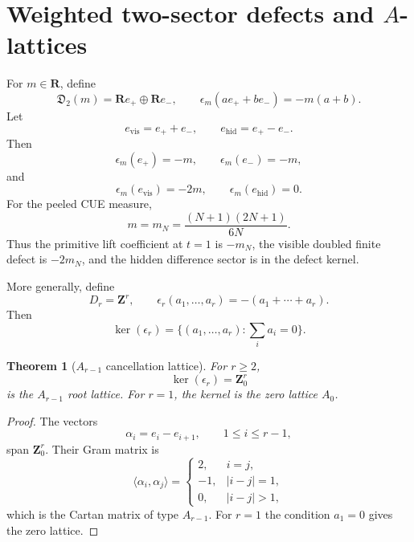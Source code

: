 \documentclass[11pt]{article}
\newcommand{\R}{\mathbf R}
\newcommand{\Z}{\mathbf Z}
\newcommand{\1}{\mathbf 1}
\newcommand{\vis}{\mathrm{vis}}
\newcommand{\hid}{\mathrm{hid}}
\newtheorem{theorem}{Theorem}[section]
\numberwithin{equation}{section}
\begin{document}
\section{Weighted two-sector defects and $A$-lattices}\label{sec:defect-module}

For $m\in\R$, define
\begin{equation}
  \mathfrak D_2(m)=\R e_+\oplus\R e_-,
  \qquad
  \epsilon_m(ae_++be_-)=-m(a+b).
\end{equation}
Let
\begin{equation}
  e_{\vis}=e_++e_-,
  \qquad
  e_{\hid}=e_+-e_-.
\end{equation}
Then
\begin{equation}
  \epsilon_m(e_+)=-m,
  \qquad
  \epsilon_m(e_-)=-m,
\end{equation}
and
\begin{equation}
  \epsilon_m(e_{\vis})=-2m,
  \qquad
  \epsilon_m(e_{\hid})=0.
\end{equation}
For the peeled CUE measure,
\begin{equation}
  m=m_N=\frac{(N+1)(2N+1)}{6N}.
\end{equation}
Thus the primitive lift coefficient at $t=1$ is $-m_N$, the visible doubled finite defect is $-2m_N$, and the hidden difference sector is in the defect kernel.

More generally, define
\begin{equation}
  D_r=\Z^r,
  \qquad
  \epsilon_r(a_1,\dots,a_r)=-(a_1+\cdots+a_r).
\end{equation}
Then
\begin{equation}
  \ker(\epsilon_r)=\{(a_1,\dots,a_r):\sum_i a_i=0\}.
\end{equation}

\begin{theorem}[$A_{r-1}$ cancellation lattice]\label{thm:A-lattice}
For $r\ge2$,
\begin{equation}
  \ker(\epsilon_r)=\Z^r_0
\end{equation}
is the $A_{r-1}$ root lattice.  For $r=1$, the kernel is the zero lattice $A_0$.
\end{theorem}

\begin{proof}
The vectors
\begin{equation}
  \alpha_i=e_i-e_{i+1},\qquad 1\le i\le r-1,
\end{equation}
span $\Z^r_0$.  Their Gram matrix is
\begin{equation}
  \langle\alpha_i,\alpha_j\rangle=
  \begin{cases}
    2,&i=j,\\
    -1,&|i-j|=1,\\
    0,&|i-j|>1,
  \end{cases}
\end{equation}
which is the Cartan matrix of type $A_{r-1}$.  For $r=1$ the condition $a_1=0$ gives the zero lattice.
\end{proof}
\end{document}
